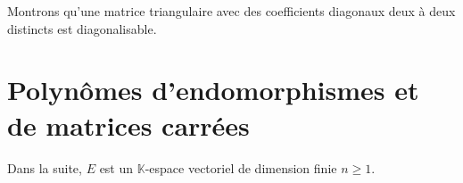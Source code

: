 \documentclass[a4paper,10pt]{report}
\begin{document}
\medskip

\begin{ex} Montrons qu'une matrice triangulaire avec des coefficients diagonaux deux à deux distincts est diagonalisable.

\vspace{4cm}
\end{ex}
%
%
%
%
%
%
%

%
%


\section{Polynômes d'endomorphismes et de matrices carrées}
\noindent Dans la suite, $E$ est un $\mathbb{K}$-espace vectoriel de dimension finie $n \geq 1$.
\end{document}
